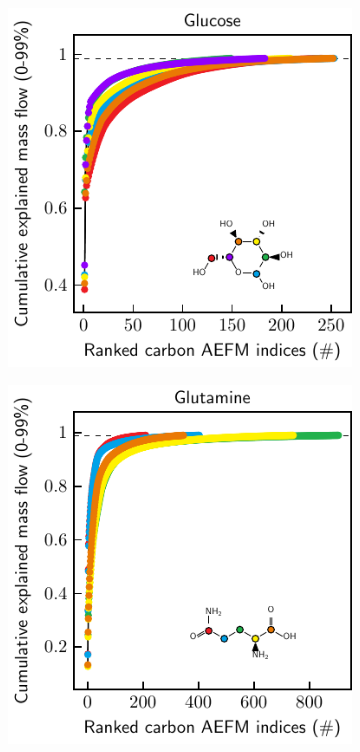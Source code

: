 \documentclass[]{article}
\begin{document}
\begin{figure}
\begin{subfigure}[t]{0.247\textwidth}
    \end{subfigure}
    \begin{subfigure}[t]{0.247\textwidth}
        \caption{}
        \includegraphics[width=\textwidth]{subpanels/cumulative-source-met-13-legend.pdf}\\
    \end{subfigure}
    \begin{subfigure}[t]{0.247\textwidth}
        \caption{}
        \includegraphics[width=\textwidth]{subpanels/cumulative-source-met-14-legend.pdf}\\
    \end{subfigure}


\end{figure}
\end{document}
